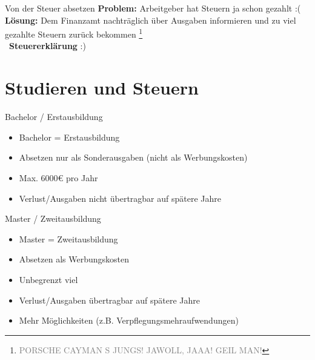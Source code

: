 \documentclass{beamer}
\newcommand{\n}{\hfill\\\vspace{0.25cm}}
\let\oldfootnote\footnote
\renewcommand{\footnote}[1]
{%
	\oldfootnote
	{
		\tiny
		\textcolor{gray}{#1}
	}%
}
\begin{document}
			\begin{frame}{Von der Steuer absetzen}
				\textbf{Problem:} Arbeitgeber hat Steuern ja schon gezahlt :(\n
				\textbf{Lösung:} Dem Finanzamt nachträglich über Ausgaben informieren und zu viel gezahlte Steuern zurück bekommen\footnote{PORSCHE CAYMAN S JUNGS! JAWOLL, JAAA! GEIL MAN!}\n
				\textrightarrow\ \textbf{Steuererklärung} :)
			\end{frame}
		
	\section{Studieren und Steuern}
	
		\begin{frame}
		\end{frame}
	
		\begin{frame}{Bachelor / Erstausbildung}
			\begin{itemize}
				\item Bachelor = Erstausbildung
				\item Absetzen nur als Sonderausgaben (nicht als Werbungskosten)
				\item Max. 6000€ pro Jahr
				\item Verlust/Ausgaben nicht übertragbar auf spätere Jahre
			\end{itemize}
		\end{frame}
	
		\begin{frame}{Master / Zweitausbildung}
			\begin{itemize}
				\item Master = Zweitausbildung
				\item Absetzen als Werbungskosten
				\item Unbegrenzt viel
				\item Verlust/Ausgaben übertragbar auf spätere Jahre
				\item Mehr Möglichkeiten (z.B. Verpflegungsmehraufwendungen)
			\end{itemize}
		\end{frame}
	
\end{document}
